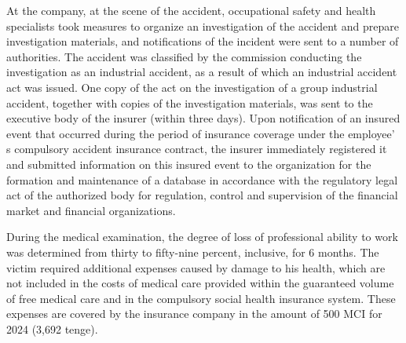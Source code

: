 \begin{multicols}{2}
At the company, at the scene of the accident, occupational safety and
health specialists took measures to organize an investigation of the
accident and prepare investigation materials, and notifications of the
incident were sent to a number of authorities. The accident was
classified by the commission conducting the investigation as an
industrial accident, as a result of which an industrial accident act was
issued. One copy of the act on the investigation of a group industrial
accident, together with copies of the investigation materials, was sent
to the executive body of the insurer (within three days). Upon
notification of an insured event that occurred during the period of
insurance coverage under the employee' s compulsory
accident insurance contract, the insurer immediately registered it and
submitted information on this insured event to the organization for the
formation and maintenance of a database in accordance with the
regulatory legal act of the authorized body for regulation, control and
supervision of the financial market and financial organizations.

During the medical examination, the degree of loss of professional
ability to work was determined from thirty to fifty-nine percent,
inclusive, for 6 months. The victim required additional expenses caused
by damage to his health, which are not included in the costs of medical
care provided within the guaranteed volume of free medical care and in
the compulsory social health insurance system. These expenses are
covered by the insurance company in the amount of 500 MCI for 2024
(3,692 tenge).
\end{multicols}

